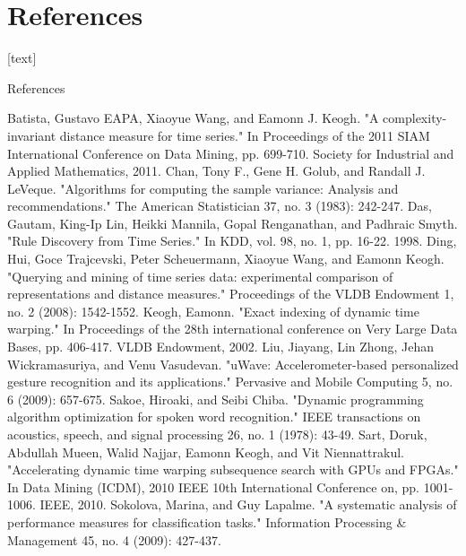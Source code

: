 \section{References}

[text]

\begin{frame}[allowframebreaks]{References}
    \begin{thebibliography}{1}
         Batista, Gustavo EAPA, Xiaoyue Wang, and Eamonn J. Keogh. "A complexity-invariant
            distance measure for time series." In Proceedings of the 2011 SIAM International Conference on Data Mining, pp.
            699-710. Society for Industrial and Applied Mathematics, 2011.
         Chan, Tony F., Gene H. Golub, and Randall J. LeVeque. "Algorithms for computing the
            sample variance: Analysis and recommendations." The American Statistician 37, no. 3 (1983): 242-247.
         Das, Gautam, King-Ip Lin, Heikki Mannila, Gopal Renganathan, and Padhraic Smyth. "Rule
            Discovery from Time Series." In KDD, vol. 98, no. 1, pp. 16-22. 1998.
         Ding, Hui, Goce Trajcevski, Peter Scheuermann, Xiaoyue Wang, and Eamonn Keogh. "Querying
            and mining of time series data: experimental comparison of representations and distance measures." Proceedings
            of the VLDB Endowment 1, no. 2 (2008): 1542-1552.
         Keogh, Eamonn. "Exact indexing of dynamic time warping." In Proceedings of the 28th
            international conference on Very Large Data Bases, pp. 406-417. VLDB Endowment, 2002.
         Liu, Jiayang, Lin Zhong, Jehan Wickramasuriya, and Venu Vasudevan. "uWave:
            Accelerometer-based personalized gesture recognition and its applications." Pervasive and Mobile Computing 5,
            no. 6 (2009): 657-675.
         Sakoe, Hiroaki, and Seibi Chiba. "Dynamic programming algorithm optimization for spoken
            word recognition." IEEE transactions on acoustics, speech, and signal processing 26, no. 1 (1978): 43-49.
         Sart, Doruk, Abdullah Mueen, Walid Najjar, Eamonn Keogh, and Vit Niennattrakul.
            "Accelerating dynamic time warping subsequence search with GPUs and FPGAs." In Data Mining (ICDM), 2010 IEEE
            10th International Conference on, pp. 1001-1006. IEEE, 2010.
         Sokolova, Marina, and Guy Lapalme. "A systematic analysis of performance measures
            for classification tasks." Information Processing \& Management 45, no. 4 (2009): 427-437.
    \end{thebibliography}
\end{frame}
